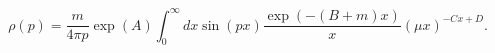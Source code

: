 \begin{equation}
\rho(p)=\frac{m}{4\pi p}\exp(A)\int_{0}^{\infty}dx\sin(px)\frac{\exp
(-(B+m)x)}{x}(\mu x)^{-Cx+D}.
\end{equation}

